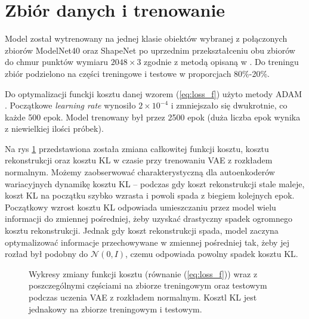 \documentclass{iithesis}
\begin{document}
%

\section{Zbiór danych i trenowanie} \label{sec:training_process}
Model został wytrenowany na jednej klasie obiektów wybranej z połączonych zbiorów ModelNet40 \cite{modelnet}
oraz ShapeNet \cite{shapenet} po uprzednim przekształceniu obu zbiorów do
chmur punktów wymiaru $2048 \times 3$ zgodnie z metodą opisaną w \cite{pc_representations}.
Do treningu zbiór podzielono na części treningowe i testowe w proporcjach 80\%-20\%.

Do optymalizacji funckji kosztu danej wzorem (\ref{eq:loss_f}) użyto metody ADAM \cite{adam}. Początkowe
\textit{learning rate} wynosiło $2 \times 10^{-4}$ i zmniejszało się dwukrotnie, co każde 500 epok.
Model trenowany był przez 2500 epok (duża liczba epok wynika z niewielkiej ilości próbek).

Na rys \ref{fig:loss_decrease} przedstawiona została zmiana całkowitej funkcji kosztu,
kosztu rekonstrukcji oraz kosztu KL w czasie przy trenowaniu VAE z rozkładem normalnym.
Możemy zaobserwować charakterystyczną dla autoenkoderów
wariacyjnych dynamikę kosztu KL -- podczas gdy koszt rekonstrukcji stale maleje, koszt KL na początku
szybko wzrasta i powoli spada z biegiem kolejnych epok. Początkowy wzrost kosztu KL odpowiada umieszczaniu
przez model wielu informacji do zmiennej pośredniej,
żeby uzyskać drastyczny spadek ogromnego kosztu rekonstrukcji. Jednak gdy koszt rekonstrukcji spada,
model zaczyna optymalizować informacje przechowywane w zmiennej pośredniej
tak, żeby jej rozład był podobny do $\mathcal{N}(0, I)$, czemu odpowiada powolny spadek kosztu KL.

\begin{figure}

    \vspace*{\floatsep }

    \caption{\label{fig:loss_decrease} Wykresy zmiany funkcji kosztu (równanie (\ref{eq:loss_f}))
    wraz z poszczególnymi częściami na zbiorze treningowym oraz testowym podczas
    uczenia VAE z rozkładem normalnym. Kosztl KL jest jednakowy na zbiorze treningowym i testowym.}
\end{figure}
\end{document}
